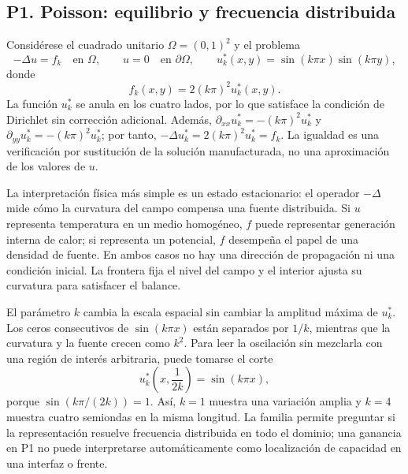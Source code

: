 \subsection{P1. Poisson: equilibrio y frecuencia distribuida}

Considérese el cuadrado unitario $\Omega=(0,1)^2$ y el problema
\begin{equation}
-\Delta u=f_k \quad \text{en }\Omega,
\qquad u=0 \quad \text{en }\partial\Omega,
\qquad
u_k^*(x,y)=\sin(k\pi x)\sin(k\pi y),
\label{eq:expansion-p1-poisson}
\end{equation}
donde
\begin{equation}
f_k(x,y)=2(k\pi)^2u_k^*(x,y).
\label{eq:expansion-p1-source}
\end{equation}
La función $u_k^*$ se anula en los cuatro lados, por lo que satisface la
condición de Dirichlet sin corrección adicional. Además,
$\partial_{xx}u_k^*=-(k\pi)^2u_k^*$ y
$\partial_{yy}u_k^*=-(k\pi)^2u_k^*$; por tanto,
$-\Delta u_k^*=2(k\pi)^2u_k^*=f_k$. La igualdad es una verificación por
sustitución de la solución manufacturada, no una aproximación de los valores
de $u$.

La interpretación física más simple es un estado estacionario: el operador
$-\Delta$ mide cómo la curvatura del campo compensa una fuente distribuida.
Si $u$ representa temperatura en un medio homogéneo, $f$ puede representar
generación interna de calor; si representa un potencial, $f$ desempeña el
papel de una densidad de fuente. En ambos casos no hay una dirección de
propagación ni una condición inicial. La frontera fija el nivel del campo y
el interior ajusta su curvatura para satisfacer el balance.

El parámetro $k$ cambia la escala espacial sin cambiar la amplitud máxima de
$u_k^*$. Los ceros consecutivos de $\sin(k\pi x)$ están separados por
$1/k$, mientras que la curvatura y la fuente crecen como $k^2$. Para leer
la oscilación sin mezclarla con una región de interés arbitraria, puede
tomarse el corte
\begin{equation}
u_k^*\!\left(x,\frac{1}{2k}\right)=\sin(k\pi x),
\label{eq:expansion-p1-corte}
\end{equation}
porque $\sin(k\pi/(2k))=1$. Así, $k=1$ muestra una variación amplia y
$k=4$ muestra cuatro semiondas en la misma longitud. La familia permite
preguntar si la representación resuelve frecuencia distribuida en todo el
dominio; una ganancia en P1 no puede interpretarse automáticamente como
localización de capacidad en una interfaz o frente.

